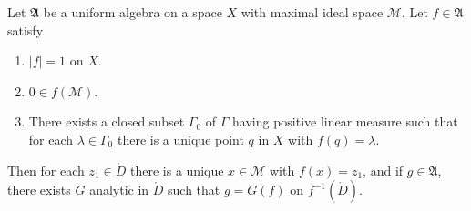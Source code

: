 
Let $\mathfrak{A}$ be a uniform algebra on a space $X$ with maximal ideal space $\mathcal{M}$. Let $f \in \mathfrak{A}$ satisfy
\begin{enumerate}
\item[(a)] $|f| = 1$ on $X$.
\item[(b)] $0 \in f(\mathcal{M})$.
\item[(c)] There exists a closed subset $\Gamma_0$ of $\Gamma$ having positive linear measure such that for each $\lambda \in \Gamma_0$ there is a unique point $q$ in $X$ with $f(q) = \lambda$.
\end{enumerate}
Then for each $z_1 \in \mathring{D}$ there is a unique $x \in \mathcal{M}$ with $f(x) = z_1$, and if $g \in \mathfrak{A}$, there exists $G$ analytic in $\mathring{D}$ such that $g = G(f)$ on $f^{-1}(\mathring{D})$.

